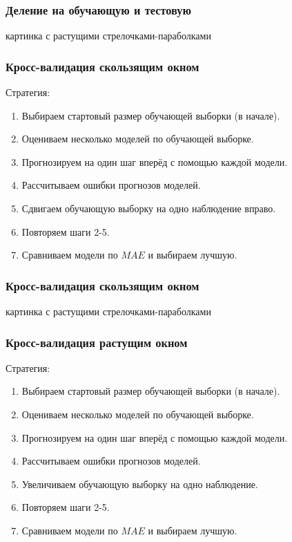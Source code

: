 \begin{frame}
    \frametitle{Деление на обучающую и тестовую}

    картинка с растущими стрелочками-параболками

\end{frame}


\begin{frame}
    \frametitle{Кросс-валидация скользящим окном}

    Стратегия:
    \begin{enumerate}[<+->]
        \item Выбираем стартовый размер \alert{обучающей} выборки (в начале).
        \item \alert{Оцениваем} несколько моделей по обучающей выборке.
        \item \alert{Прогнозируем} на один шаг вперёд с помощью каждой модели. 
        \item Рассчитываем \alert{ошибки} прогнозов моделей.  
        \item \alert{Сдвигаем} обучающую выборку на одно наблюдение вправо. 
        \item Повторяем шаги 2-5.
        \item \alert{Сравниваем} модели по $MAE$ и выбираем лучшую.
    \end{enumerate}

\end{frame}


\begin{frame}
    \frametitle{Кросс-валидация скользящим окном}

    картинка с растущими стрелочками-параболками

\end{frame}



\begin{frame}
    \frametitle{Кросс-валидация растущим окном}

    Стратегия:
    \begin{enumerate}
        \item Выбираем стартовый размер обучающей выборки (в начале).
        \item Оцениваем несколько моделей по обучающей выборке.
        \item Прогнозируем на один шаг вперёд с помощью каждой модели. 
        \item Рассчитываем ошибки прогнозов моделей.  
        \item \alert{Увеличиваем} обучающую выборку на одно наблюдение. 
        \item Повторяем шаги 2-5.
        \item Сравниваем модели по $MAE$ и выбираем лучшую.
    \end{enumerate}

\end{frame}


